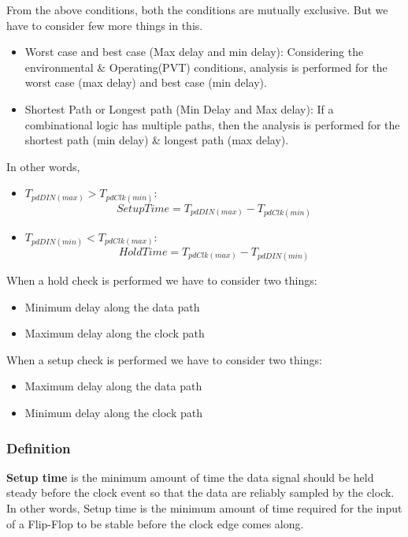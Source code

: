 From the above conditions, both the conditions are mutually exclusive. But we have to consider few more things in this.

\begin{itemize}
    \item Worst case and best case (Max delay and min delay): Considering the environmental \& Operating(PVT) conditions, analysis is performed for the worst case (max delay) and best case (min delay).
    \item Shortest Path or Longest path (Min Delay and Max delay): If a combinational logic has multiple paths, then the analysis is performed for the shortest path (min delay) \& longest path (max delay).
\end{itemize}

In other words,
\begin{itemize}
    \item \(T_{pdDIN(max)} > T_{pdClk(min)}\): \[Setup Time = T_{pdDIN(max)} - T_{pdClk(min)} \]
    \item  \(T_{pdDIN(min)} < T_{pdClk(max)}\): \[Hold Time = T_{pdClk(max)} - T_{pdDIN(min)} \]
\end{itemize}

When a hold check is performed we have to consider two things:
\begin{itemize}
    \item Minimum delay along the data path
    \item Maximum delay along the clock path 
\end{itemize}

When a setup check is performed we have to consider two things:
\begin{itemize}
    \item Maximum delay along the data path
    \item Minimum delay along the clock path 
\end{itemize}

\subsubsection{Definition}

\textbf{Setup time} is the minimum amount of time the data signal should be held steady before the clock event so that the data are reliably sampled by the clock. In other words, Setup time is the minimum amount of time required for the input of a Flip-Flop to be stable before the clock edge comes along.\\ 

